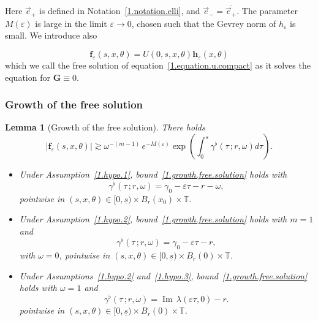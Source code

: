 \documentclass[10pt]{amsart}
\newtheorem{lemm}[cdrthm]{Lemma}
\theoremstyle{definition}
\theoremstyle{plain}
\newcommand*\e{\varepsilon}
\newcommand*\g{\gamma}
\newcommand*\f{{\mathbf f}}
\newcommand*\h{{\mathbf h}}
\newcommand*\und{\underline}
\DeclareMathOperator{\Imm}{Im}
\begin{document}
Here $\vec{e}_{+}$ is defined in Notation~\ref{1.notation.elli}, and $\vec{e}_{-} = \overline{\vec{e}_{+}}$. The parameter $M(\e)$ is large in the limit $\e\to 0$, chosen such that the Gevrey norm of $h_{\e}$ is small. We introduce also

\begin{equation}\label{1.free.solution}
\f_{\e}(s,x,\theta) = U(0,s,x,\theta) \h_{\e}(x,\theta)
\end{equation}
which we call the free solution of equation~\eqref{1.equation.u.compact} as it solves the equation for ${\mathbf G} \equiv 0$.


\subsubsection{Growth of the free solution}


\begin{lemm}[Growth of the free solution]\label{1.lemma.growth.free.solution}
There holds
\begin{equation}\label{1.growth.free.solution}
|\f_{\e}(s,x,\theta)| \gtrsim \omega^{-(m-1)}\,e^{-M(\e)}\exp\left(\int_{0}^{s} \g^{\flat}(\tau \,;r,\omega) d\tau \right).
\end{equation}


\begin{itemize}
\item Under Assumption~\ref{1.hypo.1}, bound~\eqref{1.growth.free.solution} holds with
\begin{equation}\label{1.bound.g.flat}
\g^{\flat}(\tau \,; r,\omega) = \g_0 - \e \tau - r - \omega,
\end{equation}
pointwise in $(s,x,\theta)\in[0,\und{s})\times B_r(x_0)\times\mathbb{T}$.

\item Under Assumption~\ref{1.hypo.2}, bound~\eqref{1.growth.free.solution} holds with $m=1$ and
\begin{equation}\label{1.bound.g.flat.bis}
\g^{\flat}(\tau \,; r,\omega) = \g_0 - \e \tau - r,
\end{equation}
with $\omega = 0$, pointwise in $(s,x,\theta)\in[0,\und{s})\times B_r(0)\times\mathbb{T}$.

\item Under Assumptions~\ref{1.hypo.2} and~\ref{1.hypo.3}, bound~\eqref{1.growth.free.solution} holds with $\omega = 1$ and
\begin{equation}\label{1.bound.g.flat.max}
\g^{\flat}(\tau \,; r,\omega) = {\Imm}\,\lambda(\e\tau,0) - r.
\end{equation}
pointwise in $(s,x,\theta)\in[0,\und{s})\times B_r(0)\times\mathbb{T}$.
\end{itemize}
\end{lemm}
\end{document}
